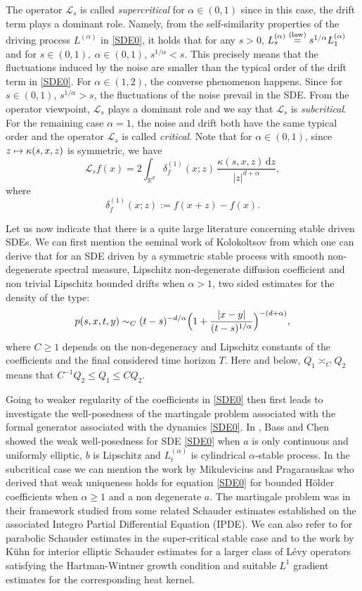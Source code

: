 \documentclass[11pt]{article}
\numberwithin{equation}{section}\providecommand{\asymp}{\mathrel{\sim}}
\def\mto{\mathchoice{\longmapsto}{\mapsto}{\mapsto}{\mapsto}}
\theoremstyle{plain}
\theoremstyle{definition}
\newcommand\cL{{\mathcal L}}
\newcommand\mR{\mathbb{R}}
\newcommand\1{{\mathbf{1}}}
\newcommand\sL{{\mathscr L}}
\newcommand{\dif}{\,\mathrm{d}}
\begin{document}
The operator $\sL_{s}$ is called \textit{supercritical} for $\alpha\in(0,1)$ since in this case, the drift term plays a dominant role. Namely, from the self-similarity properties of the driving process $L^{(\alpha)}$ in \eqref{SDE0}, it holds that for any $s>0$, $L_s^{(\alpha)} \overset{({\rm law})}{=} s^{1/\alpha}L_1^{(\alpha)} $ and for $s\in (0,1),\ \alpha\in (0,1)$, $s^{1/\alpha}< s $. This precisely means that the fluctuations induced by the noise are smaller than the typical order of the drift term in \eqref{SDE0}.
For $\alpha\in(1,2)$, the converse phenomenon happens. Since for $s\in (0,1) $, $s^{1/\alpha}>s $, the fluctuations of the noise prevail in the SDE. From the operator viewpoint, $\cL_{s}$ plays a dominant role and we say that $\sL_{s}$ is \textit{subcritical}. For the remaining case $\alpha=1$, the noise and drift both have the same typical order and the operator $\sL_{s}$ is called \textit{critical}.
Note that for $\alpha\in(0,1)$, since $z\mto\kappa(s,x,z)$ is symmetric, we have
\[
\cL_{s} f(x)=2\int_{\mR^d}\delta^{(1)}_f(x;z)\,\frac{\kappa(s,x,z)\dif z}{|z|^{d+\alpha}},
\]
where
\[
\delta^{(1)}_f(x;z):=f(x+z)-f(x).
\]

Let us now indicate that there is a quite large literature concerning stable driven SDEs. We can first mention the seminal work of Kolokoltsov \cite{kolo:00} {from which one can derive} that for an SDE driven by a symmetric stable process with smooth non-degenerate spectral measure, Lipschitz non-degenerate diffusion coefficient and non trivial Lipschitz bounded drifts when $\alpha>1 $, two sided estimates for the density of the type:
\begin{equation}\label{FIRST_TW}
p(s,x,t,y)\asymp_C (t-s)^{-d/\alpha} \Bigl(1+\frac{|x-y|}{(t-s)^{1/\alpha}}\Bigr)^{-(d+\alpha)},
\end{equation}
where $C\ge 1$ depends on the non-degeneracy and Lipschitz constants of the coefficients and the final considered time horizon $T$.
Here and below, $Q_1\asymp_C Q_2$ means that $C^{-1}Q_2\leq Q_1\leq C Q_2$.

Going to weaker regularity of the coefficients in \eqref{SDE0} then first leads to investigate the well-posedness of the martingale problem associated with the formal generator associated with the dynamics \eqref{SDE0}. In \cite{Ba-Ch},
Bass and Chen showed the weak well-posedness for SDE \eqref{SDE0} when $a$ is only continuous and uniformly elliptic,
$b$ is Lipschitz and $L^{(\alpha)}_t$ is cylindrical $\alpha$-stable process.
In the subcritical case we can mention the work by Mikulevicius and Pragarauskas \cite{miku:prag:14}
who derived that weak uniqueness holds for equation \eqref{SDE0} for bounded Hölder coefficients when $ \alpha\ge 1$
and a non degenerate $a$. The martingale problem was in their framework studied from some related Schauder estimates established on the associated Integro Partial Differential Equation (IPDE). We can also refer to \cite{chau:meno:prio:20} for {parabolic} Schauder estimates in the super-critical {stable} case and {to the work by Kühn \cite{kuhn:20} for interior elliptic Schauder estimates for a larger class of Lévy operators satisfying the Hartman-Wintner growth condition and suitable $L^1$ gradient estimates for the corresponding heat kernel}.
\end{document}
